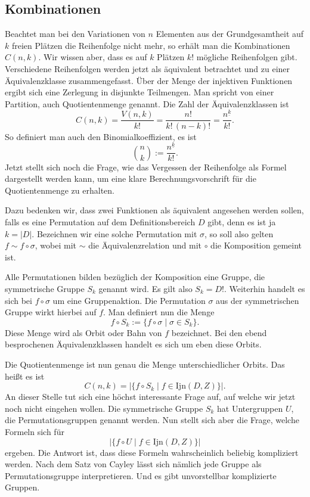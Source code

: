 \documentclass[a4paper,12pt,fleqn]{article}
\begin{document}
\subsection{Kombinationen}
Beachtet man bei den Variationen von $n$ Elementen aus der
Grundgesamtheit auf $k$ freien Plätzen die Reihenfolge nicht mehr,
so erhält man die Kombinationen $C(n,k)$. Wir wissen aber, dass
es auf $k$ Plätzen $k!$ mögliche Reihenfolgen gibt. Verschiedene
Reihenfolgen werden jetzt als äquivalent betrachtet und zu
einer Äquivalenzklasse zusammengefasst. Über der Menge der
injektiven Funktionen ergibt sich eine Zerlegung in disjunkte
Teilmengen. Man spricht von einer Partition, auch Quotientenmenge
genannt. Die Zahl der Äquivalenzklassen ist
\[C(n,k) = \frac{V(n,k)}{k!} = \frac{n!}{k!\,(n-k)!}
= \frac{n^{\underline k}}{k!}.\]
So definiert man auch den Binomialkoeffizient, es ist
\[\binom{n}{k} := \frac{n^{\underline k}}{k!}.\]
Jetzt stellt sich noch die Frage, wie das Vergessen der Reihenfolge
als Formel dargestellt werden kann, um eine klare
Berechnungsvorschrift für die Quotientenmenge zu erhalten.

Dazu bedenken wir, dass zwei Funktionen als äquivalent angesehen
werden sollen, falls es eine Permutation auf dem
Definitionsbereich $D$ gibt, denn es ist ja $k=|D|$. Bezeichnen
wir eine solche Permutation mit $\sigma$, so soll also gelten
$f\sim f\circ\sigma$, wobei mit $\sim$ die Äquivalenzrelation
und mit $\circ$ die Komposition gemeint ist.

Alle Permutationen bilden bezüglich der Komposition eine Gruppe,
die symmetrische Gruppe $S_k$ genannt wird. Es gilt also
$S_k=D!$. Weiterhin handelt es sich bei $f\circ\sigma$ um eine
Gruppenaktion. Die Permutation $\sigma$ aus der symmetrischen
Gruppe wirkt hierbei auf $f$. Man definiert nun die Menge
\[f\circ S_k := \{f\circ\sigma\;|\;\sigma\in S_k\}.\]
Diese Menge wird als Orbit oder Bahn von $f$ bezeichnet.
Bei den ebend besprochenen Äquivalenzklassen handelt es sich
um eben diese Orbits.

Die Quotientenmenge ist nun genau die Menge unterschiedlicher
Orbits. Das heißt es ist
\[C(n,k) = |\{f\circ S_k\;|\;f\in\mathrm{Ijn}(D,Z)\}|.\]
An dieser Stelle tut sich eine höchst interessante Frage auf,
auf welche wir jetzt noch nicht eingehen wollen. Die symmetrische
Gruppe $S_k$ hat Untergruppen $U$, die Permutationsgruppen
genannt werden. Nun stellt sich aber die Frage, welche Formeln
sich für
\[|\{f\circ U\;|\;f\in\mathrm{Ijn}(D,Z)\}|\]
ergeben. Die Antwort ist, dass diese Formeln wahrscheinlich
beliebig kompliziert werden. Nach dem Satz von Cayley lässt sich
nämlich jede Gruppe als Permutationsgruppe interpretieren. Und
es gibt unvorstellbar komplizierte Gruppen.
\end{document}
